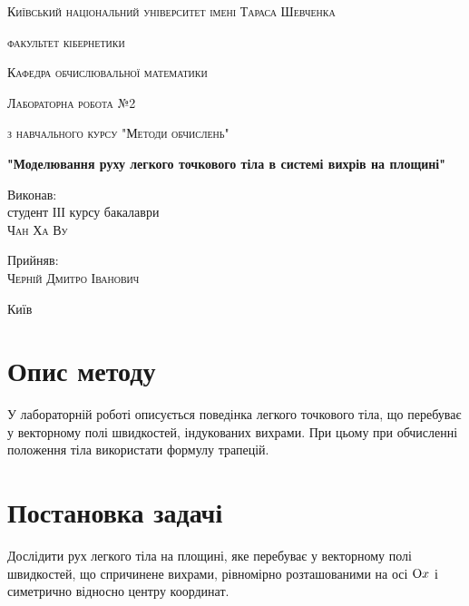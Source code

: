 \documentclass[a4paper,12pt]{article}
\begin{document}
\renewcommand{\figurename}{Мал.}

\begin{titlepage}
	\centering
	{\scshape Київський національний університет імені Тараса Шевченка\par}
	{\scshape факультет кібернетики\par}
	{\scshape Кафедра обчислювальної математики\par}

	\vspace{2cm}
	{\scshape\LARGE Лабораторна робота №2 \par}
	\vspace{0.5cm}
	{\scshape\Large з навчального курсу "Методи обчислень"\par}
	\vspace{1cm}
	{\Large\bfseries "Моделювання руху легкого точкового тіла в системі
вихрів на площині"\par}
	\vspace{3cm}
	\begin{flushright}
	{\large Виконав:\\студент ІІІ курсу бакалаври\\\textsc{Чан Ха Ву}\par}
	\vspace{1cm}
	{\large Прийняв:\\\textsc{Черній Дмитро Іванович}\par}
	\end{flushright}
	
	\vfill
	{\large Київ \the\year}
\end{titlepage}

\setlength{\parindent}{0em}
\setlength{\parskip}{1em}

\section{Опис методу}
У лабораторній роботі описується поведінка легкого точкового тіла, що перебуває у векторному полі швидкостей, індукованих вихрами. При цьому при обчисленні положення тіла використати формулу трапецій.

\section{Постановка задачі}
Дослідити рух легкого тіла на площині, яке перебуває у векторному полі швидкостей, що спричинене вихрами, рівномірно розташованими на осі $\textup{O}x$ і симетрично відносно центру координат. 
\end{document}
